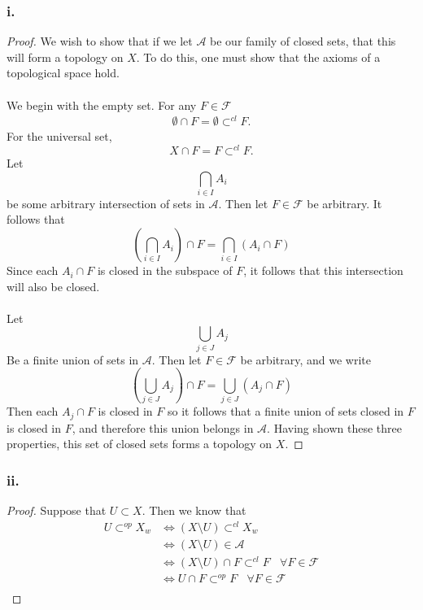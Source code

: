 \documentclass{article}
\theoremstyle{definition}
\begin{document}
    \subsubsection*{i.} 
    \begin{proof}
    We wish to show that if we let $\mathcal{A}$ be our family of closed sets, that this will form a topology on $X$. To do this, one must show that the axioms of a topological space hold.\\\\
     We begin with the empty set.
    For any $F \in \mathcal{F}$
    \begin{align*}
        \emptyset \cap F = \emptyset \subset^{cl} F.
    \end{align*}
    For the universal set,
    \[
    X \cap F = F \subset^{cl} F.
    \] 
    Let 
    \[
    \bigcap_{i \in I}A_i
    \] 
    be some arbitrary intersection of sets in $\mathcal{A}$.
    Then let $F \in \mathcal{F}$ be arbitrary. It follows that 
    \[
    \left(\bigcap_{i \in I}A_i\right) \cap F = \bigcap_{i\in I}\left(A_i \cap F\right)
    \] 
    Since each $A_i \cap F$ is closed in the subspace of $F$, it follows that this intersection will also be closed.\\\\
    Let
    \[
    \bigcup_{j \in J}A_j 
    \] 
    Be a finite union of sets in $\mathcal{A}$. Then let $F \in \mathcal{F}$ be arbitrary, and we write 
    \[
    \left(\bigcup_{j \in J}A_j\right) \cap F =
    \bigcup_{j\in J}\left(A_j \cap F\right)
    \] 
    Then each $A_j \cap F$ is closed in $F$ so it follows that a finite union of sets closed in $F$ is closed in $F$, and therefore this union belongs in $\mathcal{A}$. Having shown these three properties, this set of closed sets forms a topology on $X$.
    \end{proof}
    \subsubsection*{ii.}
    \begin{proof}
    Suppose that $U \subset X$. Then we know that 
    \begin{align*}
    U \subset^{op} X_w &\Leftrightarrow (X \setminus U) \subset^{cl} X_w\\
    &\Leftrightarrow (X \setminus U) \in \mathcal{A}\\
&\Leftrightarrow (X \setminus U) \cap F \subset^{cl} F \ \ \ \ \forall F \in \mathcal{F}\\
&\Leftrightarrow U \cap F \subset^{op} F \ \ \ \ \forall F\in\mathcal{F}\\
    \end{align*}
    \end{proof}
\end{document}
